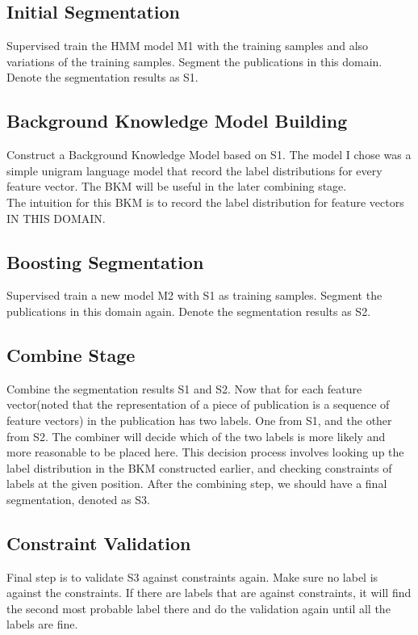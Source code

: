 \documentclass[11pt]{article}
\begin{document}
\subsection{Initial Segmentation}
Supervised train the HMM model M1 with the training samples and also variations of the training samples. Segment the publications in this domain. Denote the segmentation results as S1.

\subsection{Background Knowledge Model Building}
Construct a Background Knowledge Model based on S1. The model I chose was a simple unigram language model that record the label distributions for every feature vector. The BKM will be useful in the later combining stage.\\

The intuition for this BKM is to record the label distribution for feature vectors IN THIS DOMAIN. 

\subsection{Boosting Segmentation}

Supervised train a new model M2 with S1 as training samples. Segment the publications in this domain again. Denote the segmentation results as S2.

\subsection{Combine Stage}

Combine the segmentation results S1 and S2. Now that for each feature vector(noted that the representation of a piece of publication is a sequence of feature vectors) in the publication has two labels. One from S1, and the other from S2. The combiner will decide which of the two labels is more likely and more reasonable to be placed here. This decision process involves looking up the label distribution in the BKM constructed earlier, and checking constraints of labels at the given position. After the combining step, we should have a final segmentation, denoted as S3.

\subsection{Constraint Validation}
Final step is to validate S3 against constraints again. Make sure no label is against the constraints. If there are labels that are against constraints, it will find the second most probable label there and do the validation again until all the labels are fine. 
\end{document}

